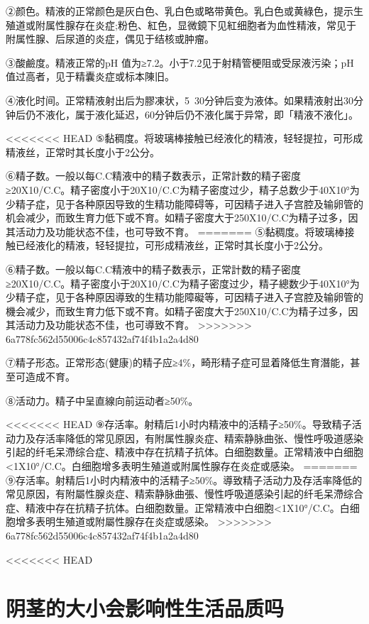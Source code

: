 \documentclass[12pt,UTF8]{ctexbook}
\begin{document}
②颜色。精液的正常颜色是灰白色、乳白色或略带黄色。乳白色或黄綠色，提示生殖道或附属性腺存在炎症;粉色、紅色，显微鏡下见紅细胞者为血性精液，常见于附属性腺、后尿道的炎症，偶见于结核或肿瘤。

③酸鹼度。精液正常的pH 值为≥7.2。小于7.2见于射精管梗阻或受尿液污染；pH值过高者，见于精囊炎症或标本陳旧。

④液化时间。正常精液射出后为膠凍状，5~30分钟后变为液体。如果精液射出30分钟后仍不液化，属于液化延迟，60分钟后仍不液化属于异常，即「精液不液化」。

<<<<<<< HEAD
⑤黏稠度。将玻璃棒接触已经液化的精液，轻轻提拉，可形成精液丝，正常时其长度小于2公分。

⑥精子数。一般以每C.C精液中的精子数表示，正常計数的精子密度≥20X10/C.C。精子密度小于20X10/C.C为精子密度过少，精子总数少于40X10°为少精子症，见于各种原因导致的生精功能障碍等，可因精子进入子宫腔及输卵管的机会减少，而致生育力低下或不育。如精子密度大于250X10/C.C为精子过多，因其活动力及功能状态不佳，也可导致不育。
=======
⑤黏稠度。将玻璃棒接触已经液化的精液，轻轻提拉，可形成精液丝，正常时其长度小于2公分。

⑥精子数。一般以每C.C精液中的精子数表示，正常計数的精子密度≥20X10/C.C。精子密度小于20X10/C.C为精子密度过少，精子總数少于40X10°为少精子症，见于各种原因導致的生精功能障礙等，可因精子进入子宫腔及输卵管的機会减少，而致生育力低下或不育。如精子密度大于250X10/C.C为精子过多，因其活动力及功能状态不佳，也可導致不育。
>>>>>>> 6a778fc562d55006c4c857432af74f4b1a2a4d80

⑦精子形态。正常形态(健康)的精子应≥4\%，畸形精子症可显着降低生育潛能，甚至可造成不育。

⑧活动力。精子中呈直線向前运动者≥50\%。

<<<<<<< HEAD
⑨存活率。射精后1小时内精液中的活精子≥50\%。导致精子活动力及存活率降低的常见原因，有附属性腺炎症、精索静脉曲张、慢性呼吸道感染引起的纤毛呆滯综合症、精液中存在抗精子抗体。白细胞数量。正常精液中白细胞<1X10°/C.C。白细胞增多表明生殖道或附属性腺存在炎症或感染。
=======
⑨存活率。射精后1小时内精液中的活精子≥50\%。導致精子活动力及存活率降低的常见原因，有附屬性腺炎症、精索静脉曲張、慢性呼吸道感染引起的纤毛呆滯综合症、精液中存在抗精子抗体。白细胞数量。正常精液中白细胞<1X10°/C.C。白细胞增多表明生殖道或附屬性腺存在炎症或感染。
>>>>>>> 6a778fc562d55006c4c857432af74f4b1a2a4d80


<<<<<<< HEAD

\section{阴茎的大小会影响性生活品质吗}
\end{document}
